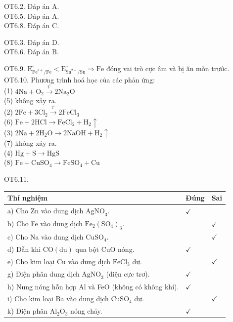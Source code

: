 \documentclass[10pt]{article}
\begin{document}
OT6.2. Đáp án A.\\
OT6.5. Đáp án A.\\
OT6.8. Đáp án C.

OT6.3. Đáp án D.\\
OT6.6. Đáp án B.

OT6.9. $\mathrm{E}_{\mathrm{Fe}^{2+} / \mathrm{Fe}}^{\circ}<\mathrm{E}_{\mathrm{Sn}^{2+} / \mathrm{Sn}}^{\circ} \Rightarrow \mathrm{Fe}$ đóng vai trò cực âm và bị ăn mòn trước.\\
OT6.10. Phương trình hoá học của các phản ứng:\\
(1) $4 \mathrm{Na}+\mathrm{O}_{2} \xrightarrow{\mathrm{t}^{\circ}} 2 \mathrm{Na}_{2} \mathrm{O}$\\
(5) không xảy ra.\\
(2) $2 \mathrm{Fe}+3 \mathrm{Cl}_{2} \xrightarrow{\mathrm{t}^{\circ}} 2 \mathrm{FeCl}_{3}$\\
(6) $\mathrm{Fe}+2 \mathrm{HCl} \rightarrow \mathrm{FeCl}_{2}+\mathrm{H}_{2} \uparrow$\\
(3) $2 \mathrm{Na}+2 \mathrm{H}_{2} \mathrm{O} \rightarrow 2 \mathrm{NaOH}+\mathrm{H}_{2} \uparrow$\\
(7) không xảy ra.\\
(4) $\mathrm{Hg}+\mathrm{S} \rightarrow \mathrm{HgS}$\\
(8) $\mathrm{Fe}+\mathrm{CuSO}_{4} \rightarrow \mathrm{FeSO}_{4}+\mathrm{Cu}$

OT6.11.

\begin{center}
\begin{tabular}{|l|l|l|}
\hline
Thí nghiệm & Đúng & Sai \\
\hline
a) Cho Zn vào dung dịch $\mathrm{AgNO}_{3}$. & $\checkmark$ &  \\
\hline
b) Cho Fe vào dung dịch $\mathrm{Fe}_{2}\left(\mathrm{SO}_{4}\right)_{3}$. &  & $\checkmark$ \\
\hline
c) Cho Na vào dung dịch $\mathrm{CuSO}_{4}$. &  & $\checkmark$ \\
\hline
d) Dẫn khi $\mathrm{CO}(\mathrm{du})$ qua bột CuO nóng. & $\checkmark$ &  \\
\hline
e) Cho kim loại Cu vào dung dịch $\mathrm{FeCl}_{3}$ dư. &  & $\checkmark$ \\
\hline
g) Điện phân dung dịch $\mathrm{AgNO}_{3}$ (điện cực trơ). & $\checkmark$ &  \\
\hline
h) Nung nóng hỗn hợp Al và FeO (không có không khí). & $\checkmark$ &  \\
\hline
i) Cho kim loại Ba vào dung dịch $\mathrm{CuSO}_{4}$ dư. &  & $\checkmark$ \\
\hline
k) Điện phân $\mathrm{Al}_{2} \mathrm{O}_{3}$ nóng chảy. & $\checkmark$ &  \\
\hline
\end{tabular}
\end{center}
\end{document}
